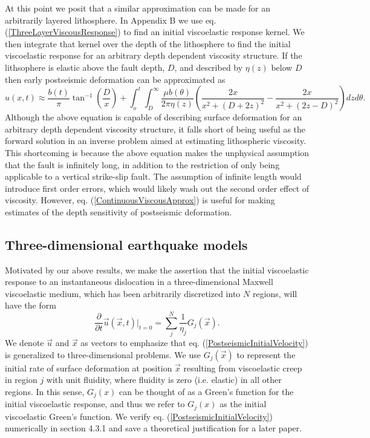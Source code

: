 \documentclass[extra]{gji}
\begin{document}
At this point we posit that a similar approximation can be made for an
arbitrarily layered lithosphere. In Appendix B we use
eq. (\ref{ThreeLayerViscousResponse}) to find an initial viscoelastic
response kernel.  We then integrate that kernel over the depth of the
lithosphere to find the initial viscoelastic response for an arbitrary
depth dependent viscosity structure.  If the lithsophere is elastic
above the fault depth, $D$, and described by $\eta(z)$ below $D$ then
early postseismic deformation can be approximated as
\begin{equation}\label{ContinuousViscousApprox}
u(x,t) \approx \frac{b(t)}{\pi}\tan^{-1}(\frac{D}{x}) + 
               \int_o^t\int_D^\infty \frac{\mu b(\theta)}{2\pi\eta(z)}
                                    \left(\frac{2x}{x^2 + \left(D + 2z\right)^2} - 
                                    \frac{2x}{x^2 + \left(2z - D\right)^2}\right)
                                    dz d\theta.
\end{equation}
Although the above equation is capable of describing surface
deformation for an arbitrary depth dependent viscosity structure, it
falls short of being useful as the forward solution in an inverse
problem aimed at estimating lithospheric viscosity.  This shortcoming
is because the above equation makes the unphysical assumption that the
fault is infinitely long, in addition to the restriction of only being
applicable to a vertical strike-slip fault.  The assumption of
infinite length would introduce first order errors, which would likely
wash out the second order effect of viscosity. However,
eq. (\ref{ContinuousViscousApprox}) is useful for making estimates of
the depth sensitivity of postseismic deformation.

\subsection{Three-dimensional earthquake models}
Motivated by our above results, we make the assertion that the initial
viscoelastic response to an instantaneous dislocation in a
three-dimensional Maxwell viscoelastic medium, which has been
arbitrarily discretized into $N$ regions, will have the form
\begin{equation}\label{PostseismicInitialVelocity}
  \frac{\partial}{\partial t}\vec{u}(\vec{x},t)\big|_{t=0} = \sum_j^N\frac{1}{\eta_j}G_j(\vec{x}).
\end{equation}
We denote $\vec{u}$ and $\vec{x}$ as vectors to emphasize that
eq. (\ref{PostseismicInitialVelocity}) is generalized to
three-dimensional problems.  We use $G_j(\vec{x})$ to represent the
initial rate of surface deformation at position $\vec{x}$ resulting
from viscoelastic creep in region $j$ with unit fluidity, where
fluidity is zero (i.e. elastic) in all other regions.  In this sense,
$G_j(x)$ can be thought of as a Green's function for the initial
viscoelastic response, and thus we refer to $G_j(x)$ as the initial
viscoelastic Green's function.  We verify
eq. (\ref{PostseismicInitialVelocity}) numerically in section 4.3.1 and
save a theoretical justification for a later paper.
\end{document}

